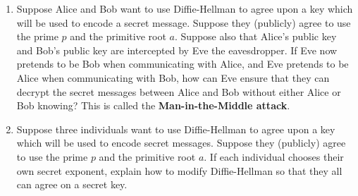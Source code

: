 \documentclass[12pt]{amsart}
\theoremstyle{definition}
\theoremstyle{remark}
\numberwithin{equation}{section}
\begin{document}
\begin{enumerate}
\begin{enumerate}
\end{enumerate}
\item Suppose Alice and Bob want to use Diffie-Hellman to agree upon a key which will be used to encode a secret message. Suppose they (publicly) agree to use the prime $p$ and the primitive root $a$. Suppose also that Alice's public key and Bob's public key are intercepted by Eve the eavesdropper. If Eve now pretends to be Bob when communicating with Alice, and Eve pretends to be Alice when communicating with Bob, how can Eve ensure that they can decrypt the secret messages between Alice and Bob without either Alice or Bob knowing? This is called the {\bf Man-in-the-Middle attack}.
\item Suppose three individuals want to use Diffie-Hellman to agree upon a key which will be used to encode secret messages. Suppose they (publicly) agree to use the prime $p$ and the primitive root $a$. If each individual chooses their own secret exponent, explain how to modify Diffie-Hellman so that they all can agree on a secret key.
\end{enumerate}
\end{document}

